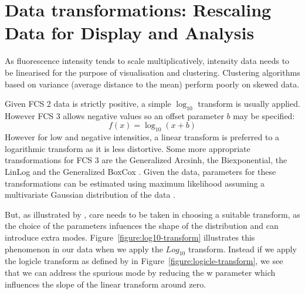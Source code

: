 \chapter{\label{appendix:transformation}Data transformations: Rescaling Data for Display and Analysis}


As fluorescence intensity tends to scale multiplicatively, intensity data needs to be linearised for the purpose of visualisation and clustering.
Clustering algorithms based on variance (average distance to the mean) perform poorly on skewed data.


Given FCS 2 data is strictly positive, a simple $\log_{10}$ transform is usually applied.
However FCS 3 allows negative values so an offset parameter $b$ may be specified:
\[
    f(x) = \log_{10}(x+b)
\]
However for low and negative intensities, a linear transform is preferred to a logarithmic transform \citep{Tung:2006uw} as it is less distortive.
Some more appropriate transformations for FCS 3 are the Generalized Arcsinh, the Biexponential, the LinLog and the Generalized BoxCox
\citep{Bagwell:2005he,Parks:2006gaa,Finak:2010is}.
Given the data, parameters for these transformations can be estimated using maximum likelihood assuming a multivariate Gaussian distribution of the data \citep{Finak:2010is}. 



But, as illustrated by \citet{Tung:2006uw}, care needs to be taken in choosing a suitable transform, as the choice of the parameters
infuences the shape of the distribution and can introduce extra modes.
Figure~\ref{figure:log10-transform} illustrates this phenomenon in our data when we apply the $Log_{10}$ transform.
Instead if we apply the logicle transform as defined by \citet{Parks:2006gaa} in Figure~\ref{figure:logicle-transform}, we see that we can address the spurious mode
by reducing the w parameter which influences the slope of the linear transform around zero.

